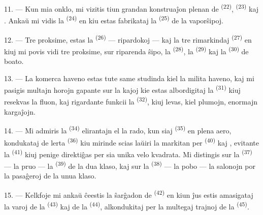 \VUsaut{3.0mm}
\VUsaut{3.0mm}

11. --- Kun mia onklo, mi vizitis tiun grandan konstruaĵon plenan de
 \textsuperscript{(22)},  \textsuperscript{(23)}
kaj . Ankaŭ mi vidis la 
\textsuperscript{(24)} en kiu estas fabrikataj la 
\textsuperscript{(25)} de la vaporŝipoj.

12. --- Tre proksime, estas la  \textsuperscript{(26)} ---
ripardokoj --- kaj la tre rimarkindaj 
\textsuperscript{(27)} en kiuj mi povis vidi tre proksime, sur riparenda ŝipo,
la  \textsuperscript{(28)}, la 
\textsuperscript{(29)} kaj la  \textsuperscript{(30)} de boato.

13. --- La komerca haveno estas tute same studinda kiel la milita haveno, kaj mi
pasigis multajn horojn gapante sur la kajoj kie estas albordigitaj la
 \textsuperscript{(31)} kiuj resekvas la fluon, kaj rigardante
funkcii la  \textsuperscript{(32)}, kiuj levas, kiel plumojn,
enormajn kargaĵojn.

\VUsaut{4.0mm}
\VUsaut{3.0mm}

14. --- Mi admiris la  \textsuperscript{(34)}
elirantajn el la rado, kun siaj  \textsuperscript{(35)} en plena
aero, kondukataj de lerta  \textsuperscript{(36)} kiu mirinde
scias laŭiri la  markitan per 
\textsuperscript{(40)} kaj , evitante la 
\textsuperscript{(41)} kiuj penige direktiĝas per sia unika velo kvadrata. Mi
distingis sur la  \textsuperscript{(37)} --- la pruo --- la
 \textsuperscript{(39)} de la dua klaso, kaj sur la
 \textsuperscript{(38)} --- la pobo --- la salonojn por la
pasaĝeroj de la unua klaso.

15. --- Kelkfoje mi ankaŭ ĉeestis la ŝarĝadon de 
\textsuperscript{(42)} en kiun ĵus estis amasigataj la varoj de la
 \textsuperscript{(43)} kaj de la 
\textsuperscript{(44)}, alkondukitaj per la multegaj trajnoj de la
 \textsuperscript{(45)}.

\VUsaut{3.0mm}
\VUsaut{3.0mm}

